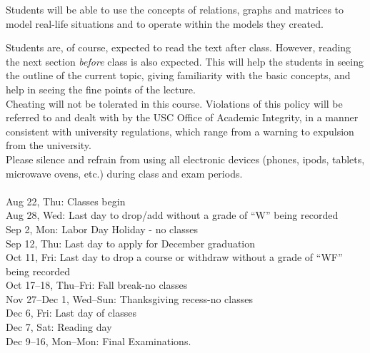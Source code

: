 \documentclass[12pt]{amsart}
\begin{document}
Students will be able to use the concepts of relations, graphs and matrices to
model real-life situations and to operate within the models they created. 
  
Students are, of course, expected to read the text after class. However, reading
the next section \emph{before} class is also expected. This will help the
students in seeing the outline of the current topic, giving familiarity with the
basic concepts, and help in seeing the fine points of the lecture.\\ 


 Cheating will not be tolerated in this
course. Violations of this policy will be referred to and dealt with by the USC
Office of Academic Integrity, in a  manner consistent with university
regulations, which range from a warning to expulsion from the university. \\

 Please silence and refrain from using all
electronic devices (phones, ipods, tablets, microwave ovens, etc.)  during class and exam periods.
\\

\\
Aug 22, Thu:	Classes begin\\
Aug 28, Wed:	Last day to drop/add without a grade of “W” being recorded\\
Sep 2, Mon:	Labor Day Holiday - no classes\\
Sep 12, Thu:	Last day to apply for December graduation\\
Oct 11, Fri:	Last day to drop a course or withdraw without a grade of “WF” being recorded\\
Oct 17--18, Thu--Fri:	Fall break-no classes\\
Nov 27--Dec 1, Wed--Sun:  Thanksgiving recess-no classes\\
Dec 6, Fri: Last day of classes\\
Dec 7, Sat: Reading day\\
Dec 9--16, Mon--Mon:	Final Examinations.
\end{document}
